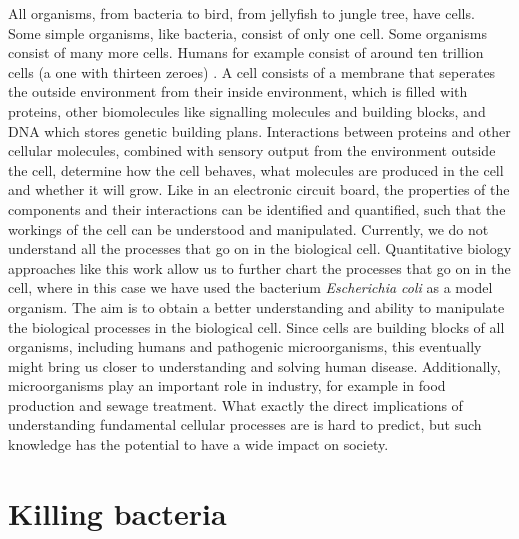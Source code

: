 All organisms, from bacteria to bird, from jellyfish to jungle tree, have cells. 
%
Some simple organisms, like bacteria, consist of only one cell.
Some organisms consist of many more cells.
Humans for example consist of around ten trillion cells (a one with thirteen zeroes) \cite[BNID 102390]{Milo2010}.
%
A cell consists of a membrane that %
seperates the outside environment from their inside environment, 
which is filled with proteins, other biomolecules like signalling molecules and building blocks, and DNA which stores genetic building plans.
%
Interactions between proteins and other cellular molecules, combined with sensory output from the environment outside the cell, 
determine how the cell behaves, what molecules are produced in the cell and whether it will grow.
%
Like 
in an electronic circuit board,
the properties of the components and their interactions can be identified and quantified,
such that the workings of the cell can be understood and manipulated.
%
Currently, we do not understand all the processes that go on in the biological cell.
%
Quantitative biology approaches like this work allow us to further chart the processes that go on in the cell,
where in this case we have used the bacterium \textit{Escherichia coli} as a model organism.
%
The aim is to obtain a better understanding and ability to manipulate the biological processes in the biological cell.
%
Since cells are building blocks of all organisms, 
including humans and pathogenic microorganisms,
this eventually might bring us closer to understanding and solving human disease.
%
Additionally, microorganisms play an important role in industry,
for example in food production and sewage treatment.
%
What exactly the direct implications of understanding fundamental cellular processes are is hard to predict,
but such knowledge has the potential to have a wide impact on society.

\section{Killing bacteria}

